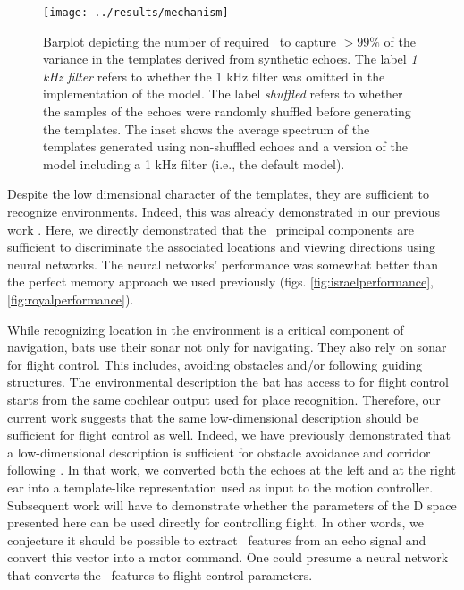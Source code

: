 \documentclass[preprint,5p]{elsarticle}
\begin{document}
\begin{figure}[tb]
	\centering
	\texttt{[image: ../results/mechanism]}
	\caption{Barplot depicting the number of required \pcs\ to capture $>99\%$ of the variance in the templates derived from synthetic echoes. The label \textit{1 kHz filter} refers to whether the 1 kHz filter was omitted in the implementation of the \citet{Wiegrebe2008} model. The label \textit{shuffled} refers to whether the samples of the echoes were randomly shuffled before generating the templates. The inset shows the average spectrum of the templates generated using non-shuffled echoes and a version of the \citet{Wiegrebe2008} model including a 1 kHz filter (i.e., the default model).}
	\label{fig:mechanism}
\end{figure}

Despite the low dimensional character of the templates, they are sufficient to recognize environments. Indeed, this was already demonstrated in our previous work \citep{Vanderelst2016}. Here, we directly demonstrated that the \pca\ principal components are sufficient to discriminate the associated locations and viewing directions using neural networks. The neural networks' performance was somewhat better than the perfect memory approach we used previously (figs. \ref{fig:israelperformance}, \ref{fig:royalperformance}).

While recognizing location in the environment is a critical component of navigation, bats use their sonar not only for navigating. They also rely on sonar for flight control. This includes, avoiding obstacles and/or following guiding structures. The environmental description the bat has access to for flight control starts from the same cochlear output  used for place recognition. Therefore, our current work suggests that the same low-dimensional description should be sufficient for flight control as well. Indeed, we have previously demonstrated that a low-dimensional description is sufficient for obstacle avoidance and corridor following \citep{Vanderelst2015a,Mansour2019}. In that work, we converted both the echoes at the left and at the right ear into a template-like representation used as input to the motion controller. Subsequent work will have to demonstrate whether the parameters of the \pca D space presented here can be used directly for controlling flight. In other words, we conjecture it should be possible to extract \pca\ features from an echo signal and convert this vector into a motor command. One could presume a neural network that converts the \pca\ features to flight control parameters.
\end{document}
